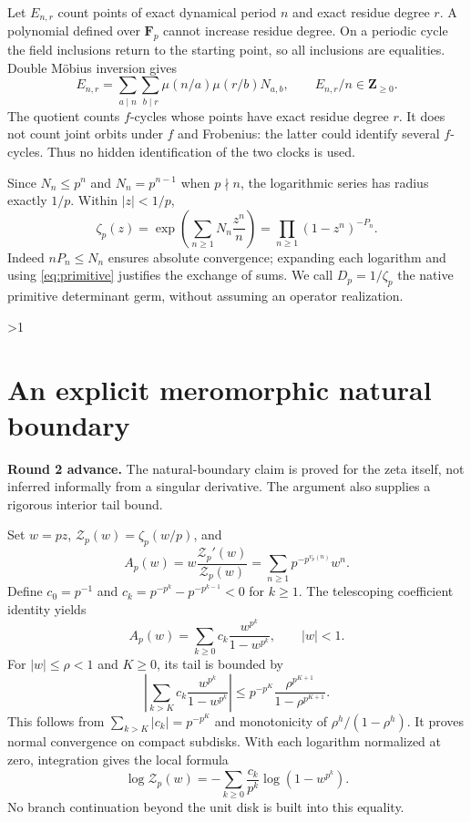 \documentclass[10pt]{article}
\newcommand{\F}{\mathbf F}
\newcommand{\Z}{\mathbf Z}
\begin{document}
Let $E_{n,r}$ count points of exact dynamical period $n$ and exact residue
degree $r$. A polynomial defined over $\F_p$ cannot increase residue
degree. On a periodic cycle the field inclusions return to the starting
point, so all inclusions are equalities. Double M\"obius inversion gives
\begin{equation}
 E_{n,r}=\sum_{a\mid n}\sum_{b\mid r}\mu(n/a)\mu(r/b)N_{a,b},
 \qquad E_{n,r}/n\in\Z_{\ge0}.\label{eq:double}
\end{equation}
The quotient counts $f$-cycles whose points have exact residue degree $r$.
It does not count joint orbits under $f$ and Frobenius: the latter could
identify several $f$-cycles. Thus no hidden identification of the two
clocks is used.

Since $N_n\le p^n$ and $N_n=p^{n-1}$ when $p\nmid n$, the logarithmic
series has radius exactly $1/p$. Within $|z|<1/p$,
\begin{equation}
 \zeta_p(z)=\exp\left(\sum_{n\ge1}N_n\frac{z^n}{n}\right)
 =\prod_{n\ge1}(1-z^n)^{-P_n}.\label{eq:euler}
\end{equation}
Indeed $nP_n\le N_n$ ensures absolute convergence; expanding each
logarithm and using \eqref{eq:primitive} justifies the exchange of sums.
We call $D_p=1/\zeta_p$ the native primitive determinant germ, without
assuming an operator realization.
\fi

\ifnum\CRevisionRound>1
\section{An explicit meromorphic natural boundary}
\noindent\textbf{Round 2 advance.} The natural-boundary claim is proved
for the zeta itself, not inferred informally from a singular derivative.
The argument also supplies a rigorous interior tail bound.

Set $w=pz$, $\mathcal Z_p(w)=\zeta_p(w/p)$, and
\[
 A_p(w)=w\frac{\mathcal Z_p'(w)}{\mathcal Z_p(w)}
       =\sum_{n\ge1}p^{-p^{v_p(n)}}w^n.
\]
Define $c_0=p^{-1}$ and
$c_k=p^{-p^k}-p^{-p^{k-1}}<0$ for $k\ge1$.
The telescoping coefficient identity yields
\begin{equation}
 A_p(w)=\sum_{k\ge0}c_k\frac{w^{p^k}}{1-w^{p^k}},\qquad |w|<1.
 \label{eq:lambert}
\end{equation}
For $|w|\le\rho<1$ and $K\ge0$, its tail is bounded by
\begin{equation}
 \left|\sum_{k>K}c_k\frac{w^{p^k}}{1-w^{p^k}}\right|
 \le p^{-p^K}\frac{\rho^{p^{K+1}}}{1-\rho^{p^{K+1}}}.
 \label{eq:tail}
\end{equation}
This follows from $\sum_{k>K}|c_k|=p^{-p^K}$ and monotonicity of
$\rho^h/(1-\rho^h)$. It proves normal convergence on compact subdisks.
With each logarithm normalized at zero, integration gives the local formula
\[
 \log\mathcal Z_p(w)=-\sum_{k\ge0}\frac{c_k}{p^k}\log(1-w^{p^k}).
\]
No branch continuation beyond the unit disk is built into this equality.
\end{document}
